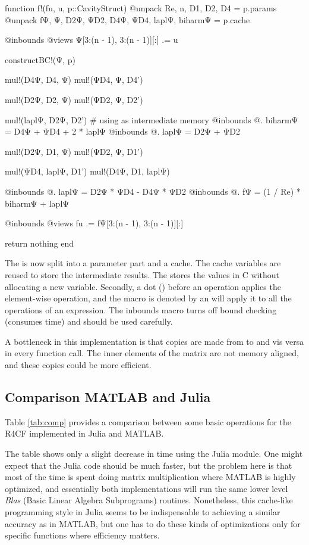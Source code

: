 \begin{jllisting}[caption=Optimized implementation in Julia of the nonlinear function $F$]
function f!(fu, u, p::CavityStruct)
    @unpack Re, n, D1, D2, D4 = p.params
    @unpack fΨ, Ψ, D2Ψ, ΨD2, D4Ψ, ΨD4, laplΨ, biharmΨ = p.cache

    @inbounds @views Ψ[3:(n - 1), 3:(n - 1)][:] .= u

    constructBC!(Ψ, p)

    mul!(D4Ψ, D4, Ψ)
    mul!(ΨD4, Ψ, D4')

    mul!(D2Ψ, D2, Ψ)
    mul!(ΨD2, Ψ, D2')

    mul!(laplΨ, D2Ψ, D2') # using as intermediate memory
    @inbounds @. biharmΨ = D4Ψ + ΨD4 + 2 * laplΨ
    @inbounds @. laplΨ = D2Ψ + ΨD2

    mul!(D2Ψ, D1, Ψ)
    mul!(ΨD2, Ψ, D1')

    mul!(ΨD4, laplΨ, D1')
    mul!(D4Ψ, D1, laplΨ)

    @inbounds @. laplΨ = D2Ψ * ΨD4 - D4Ψ * ΨD2
    @inbounds @. fΨ = (1 / Re) * biharmΨ + laplΨ

    @inbounds @views fu .= fΨ[3:(n - 1), 3:(n - 1)][:]

    return nothing
end
\end{jllisting}

The  is now split into a parameter part and a cache.
The cache variables are reused to store the intermediate results. The
 stores the values in C without allocating a new variable.
Secondly, a dot () before an operation applies the element-wise
operation, and the macro is denoted by an  will apply it to all the
operations of an expression. The  inbounds macro turns off bound
checking (consumes time) and should be used carefully.

A bottleneck in this implementation is that copies are made from  to
 and vis versa in every function call. The inner elements of the
matrix  are not memory aligned, and these copies could be more
efficient.

\subsection{Comparison MATLAB and Julia}

Table \ref{tab:comp} provides a comparison between some basic operations for the
R4CF implemented in Julia and MATLAB. 

The table shows only a slight decrease in time using the Julia module. One
might expect that the Julia code should be much faster, but the problem here is
that most of the time is spent doing matrix multiplication where MATLAB is
highly optimized, and essentially both implementations will run the same lower
level \emph{Blas} (Basic Linear Algebra Subprograms) routines. Nonetheless,
this cache-like programming style in Julia seems to be indispensable to
achieving a similar accuracy as in MATLAB, but one has to do these kinds of
optimizations only for specific functions where efficiency matters.

